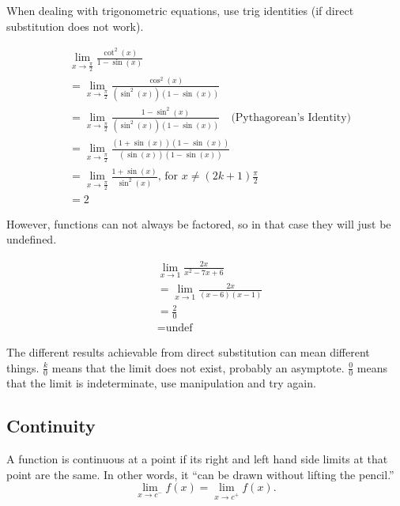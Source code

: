 \documentclass[12pt]{article}
\begin{document}
            \noindent When dealing with trigonometric equations, use trig identities (if direct substitution does not work).

            \begin{align*}
                &\lim_{x \to \frac{\pi}{2}} \frac{\cot^2(x)}{1-\sin(x)} \\[6pt]
                &= \lim_{x \to \frac{\pi}{2}} \frac{\cos^2(x)}{\left( \sin^2(x) \right)\left(1-\sin(x)\right)} \\[6pt]
                &= \lim_{x \to \frac{\pi}{2}} \frac{1-\sin^2(x)}{\left( \sin^2(x) \right)\left(1-\sin(x)\right)} \quad \text{(Pythagorean's Identity)} \\[6pt]
                &= \lim_{x \to \frac{\pi}{2}} \frac{\left( 1+\sin(x) \right)\left( 1-\sin(x) \right)}{\left( \sin(x) \right)\left(1-\sin(x)\right)} \\[6pt]
                &= \lim_{x \to \frac{\pi}{2}} \frac{1+\sin(x)}{\sin^2(x)} \text{, for } x \ne (2k+1)\frac{\pi}{2}\\[6pt]
                &= 2
            \end{align*}

            \noindent However, functions can not always be factored, so in that case they will just be undefined.

            \begin{align*}
                &\lim_{x \to 1} \frac{2x}{x^2 - 7x + 6} \\[6pt]
                &= \lim_{x \to 1} \frac{2x}{(x-6)(x-1)} \\
                &= \frac{2}{0} \\
                &= \text{undef}
            \end{align*}

            The different results achievable from direct substitution can mean different things. $\frac{k}{0}$ means that the limit does not exist, probably an asymptote. $\frac{0}{0}$ means that the limit is indeterminate, use manipulation and try again.

        \subsection{Continuity}
            A function is continuous at a point if its right and left hand side limits at that point are the same. In other words, it ``can be drawn without lifting the pencil.''
            \[ \lim_{x \to c^-} f(x) = \lim_{x \to c^+} f(x).\]
\end{document}
